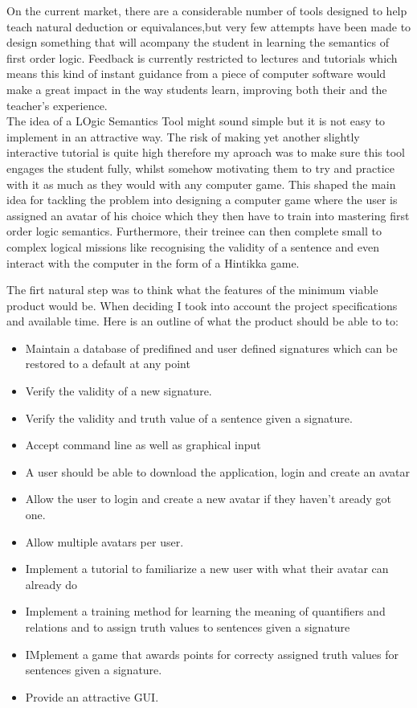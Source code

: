 \documentclass{article}
\begin{document}
On the current market, there are a considerable number of tools designed to help teach natural deduction or equivalances,but very few attempts have been made to design something that will acompany the student in learning the semantics of first order logic. Feedback is currently restricted to lectures and tutorials which means this kind of instant guidance from a piece of computer software would make a great impact in the way students learn, improving both their and the teacher's experience.\\

The idea of a LOgic Semantics Tool might sound simple but it is not easy to implement in an attractive way. The risk of making yet another slightly interactive tutorial is quite high therefore my aproach was to make sure this tool engages the student fully, whilst somehow motivating them to try and practice with it as much as they would with any computer game. This shaped the main idea for tackling the problem into designing a computer game where the user is assigned an avatar of his choice which they then have to train into mastering first order logic semantics. Furthermore, their treinee can then complete small to complex logical missions like recognising the validity of a sentence and even interact with the computer in the form of a Hintikka game.

The firt natural step was to think what the features of the minimum viable product would be. When deciding I took into account the project specifications and available time. Here is an outline of what the product should be able to to:
\begin{itemize}
	\item Maintain a database of predifined and user defined signatures which can be restored to a default at any point
	\item Verify the validity of a new signature.
	\item Verify the validity and truth value of a sentence given a signature.
	\item Accept command line as well as graphical input
	\item A user should be able to download the application, login and create an avatar
	\item Allow the user to login and create a new avatar if they haven't aready got one.
	\item Allow multiple avatars per user.
	\item Implement a tutorial to familiarize a new user with what their avatar can already do
	\item Implement a training method for learning the meaning of quantifiers and relations and to assign truth values to sentences given a signature
	\item IMplement a game that awards points for correcty assigned truth values for sentences given a signature.
	\item Provide an attractive GUI.
\end{itemize}
\end{document}
